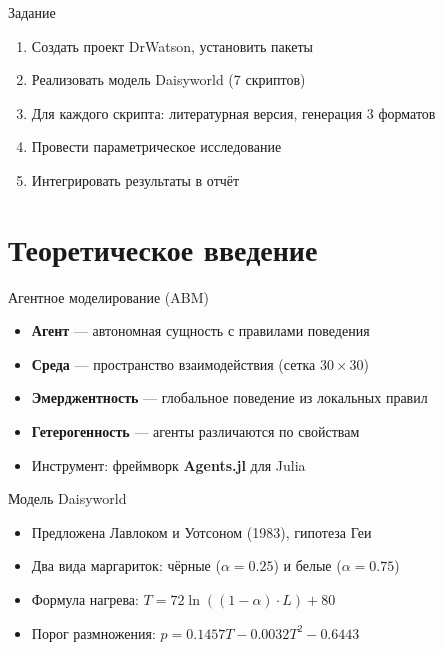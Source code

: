 \documentclass[
  ignorenonframetext,
  aspectratio=169,
  russian,
]{beamer}
\providecommand{\tightlist}{%
  \setlength{\itemsep}{0pt}\setlength{\parskip}{0pt}}\usepackage{longtable,booktabs,array}
\begin{document}
\begin{frame}{Задание}
\label{ux437ux430ux434ux430ux43dux438ux435}
\begin{enumerate}
\tightlist
\item
  Создать проект DrWatson, установить пакеты
\item
  Реализовать модель Daisyworld (7 скриптов)
\item
  Для каждого скрипта: литературная версия, генерация 3 форматов
\item
  Провести параметрическое исследование
\item
  Интегрировать результаты в отчёт
\end{enumerate}
\end{frame}

\section{Теоретическое
введение}\label{ux442ux435ux43eux440ux435ux442ux438ux447ux435ux441ux43aux43eux435-ux432ux432ux435ux434ux435ux43dux438ux435}

\begin{frame}{Агентное моделирование (ABM)}
\label{ux430ux433ux435ux43dux442ux43dux43eux435-ux43cux43eux434ux435ux43bux438ux440ux43eux432ux430ux43dux438ux435-abm}
\begin{itemize}
\tightlist
\item
  \textbf{Агент} --- автономная сущность с правилами поведения
\item
  \textbf{Среда} --- пространство взаимодействия (сетка
  \(30 \times 30\))
\item
  \textbf{Эмерджентность} --- глобальное поведение из локальных правил
\item
  \textbf{Гетерогенность} --- агенты различаются по свойствам
\item
  Инструмент: фреймворк \textbf{Agents.jl} для Julia
\end{itemize}
\end{frame}

\begin{frame}{Модель Daisyworld}
\label{ux43cux43eux434ux435ux43bux44c-daisyworld}
\begin{itemize}
\tightlist
\item
  Предложена Лавлоком и Уотсоном (1983), гипотеза Геи
\item
  Два вида маргариток: чёрные (\(\alpha = 0.25\)) и белые
  (\(\alpha = 0.75\))
\item
  Формула нагрева: \(T = 72 \ln((1-\alpha) \cdot L) + 80\)
\item
  Порог размножения: \(p = 0.1457T - 0.0032T^2 - 0.6443\)
\end{itemize}
\end{frame}
\end{document}
